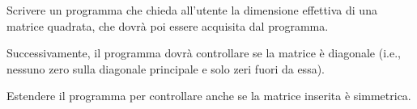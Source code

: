 \begin{Exercise}[label={ex:matrice_diagonale}]
		Scrivere un programma che chieda all'utente la dimensione effettiva di una matrice quadrata, che dovrà poi essere acquisita dal programma.

  	Successivamente, il programma dovrà controllare se la matrice è diagonale (i.e., nessuno zero sulla diagonale principale e solo zeri fuori da essa).
  	
  	Estendere il programma per controllare anche se la matrice inserita è simmetrica.
  	
\end{Exercise}

\begin{Answer}[ref={ex:matrice_diagonale}]
  	
\end{Answer}

